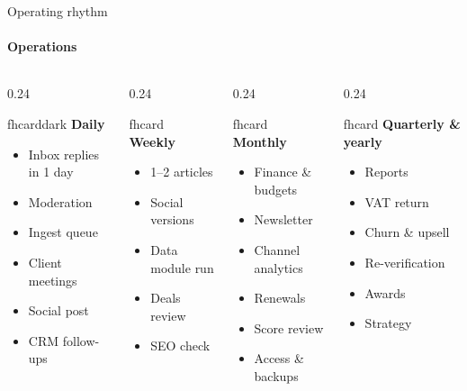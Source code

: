 \documentclass[aspectratio=169,10pt]{beamer}
\newcommand{\fhcard}[2]{%
  \begin{beamercolorbox}[wd=\linewidth,sep=7pt,rounded=true]{fhcard}
    {\small\bfseries\color{fhEmeraldDark}#1}\par\vspace{2pt}\footnotesize #2
  \end{beamercolorbox}}
\newcommand{\fhcarddark}[2]{%
  \begin{beamercolorbox}[wd=\linewidth,sep=7pt,rounded=true]{fhcarddark}
    {\small\bfseries\color{fhEmerald}#1}\par\vspace{2pt}\footnotesize #2
  \end{beamercolorbox}}
\begin{document}
\begin{frame}{Operating rhythm}
  \framesubtitle{Operations}
  \begin{columns}[T]
    \begin{column}{0.24\textwidth}
      \fhcarddark{Daily}{\begin{itemize}\scriptsize
        \item Inbox replies in 1 day
        \item Moderation
        \item Ingest queue
        \item Client meetings
        \item Social post
        \item CRM follow-ups
      \end{itemize}}
    \end{column}
    \begin{column}{0.24\textwidth}
      \fhcard{Weekly}{\begin{itemize}\scriptsize
        \item 1--2 articles
        \item Social versions
        \item Data module run
        \item Deals review
        \item SEO check
      \end{itemize}}
    \end{column}
    \begin{column}{0.24\textwidth}
      \fhcard{Monthly}{\begin{itemize}\scriptsize
        \item Finance \& budgets
        \item Newsletter
        \item Channel analytics
        \item Renewals
        \item Score review
        \item Access \& backups
      \end{itemize}}
    \end{column}
    \begin{column}{0.24\textwidth}
      \fhcard{Quarterly \& yearly}{\begin{itemize}\scriptsize
        \item Reports
        \item VAT return
        \item Churn \& upsell
        \item Re-verification
        \item Awards
        \item Strategy
      \end{itemize}}
    \end{column}
  \end{columns}
\end{frame}
\end{document}
